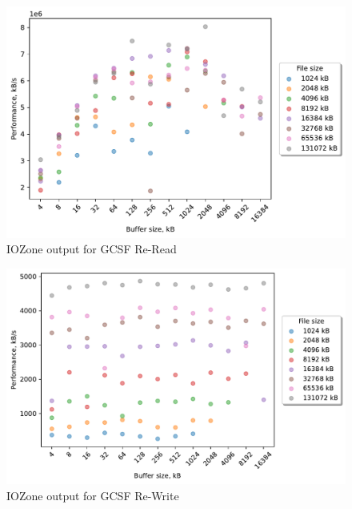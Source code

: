 \begin{figure}[!htb]
	\label{fig:bench_gcsf_re_read}
	\begin{center}
		\includegraphics[width=1.0\textwidth]{figures/benchmarking/gcsf/Re-Read.pdf}
	\end{center}
	\caption{IOZone output for GCSF \mbox{Re-Read}}
\end{figure}

\begin{figure}[!htb]
	\label{fig:bench_gcsf_re_write}
	\begin{center}
		\includegraphics[width=1.0\textwidth]{figures/benchmarking/gcsf/Re-Write.pdf}
	\end{center}
	\caption{IOZone output for GCSF \mbox{Re-Write}}
\end{figure}

